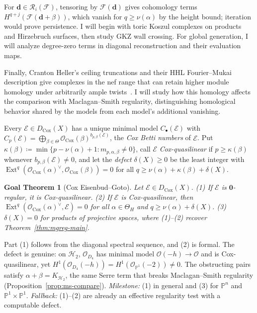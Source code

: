 \documentclass[11pt,reqno]{amsart}
\newtheorem{goalTheorem}[lemma]{Goal Theorem}
\theoremstyle{remark}
\newcommand{\Ext}{\operatorname{Ext}}
\newcommand{\Cox}{\operatorname{Cox}}
\newcommand{\dd}{\mathbf{d}}
\newcommand{\zero}{\mathbf{0}}
\newcommand{\PP}{\mathbb{P}}
\newcommand{\cE}{\mathcal{E}}
\newcommand{\cF}{\mathcal{F}}
\newcommand{\cH}{\mathcal{H}}
\newcommand{\cO}{\mathcal{O}}
\newcommand{\cR}{\mathcal{R}}
\begin{document}
For $\dd\in\cR_i(\cF)$, tensoring by $\cF(\dd)$ gives cohomology terms $H^{q+j}(\cF(\dd+\beta))$, which vanish for $q\geq\nu(\alpha)$ by the height bound; iteration would prove persistence. I will begin with toric Koszul complexes on products and Hirzebruch surfaces, then study GKZ wall crossing. For global generation, I will analyze degree-zero terms in diagonal reconstruction and their evaluation maps.

Finally, Cranton Heller's ceiling truncations and their HHL Fourier--Mukai description give complexes in the nef range that can retain higher module homology under arbitrarily ample twists~\cite{CH25}. I will study how this homology affects the comparison with Maclagan--Smith regularity, distinguishing homological behavior shared by the models from each model's additional vanishing.


 Every $\cE\in D_{\Cox}(X)$ has a unique minimal model $C_\bullet(\cE)$ with $C_p(\cE)=\bigoplus_{\beta\in\Theta}\cO_{\Cox}(\beta)^{b_{p,\beta}(\cE)}$, the \emph{Cox Betti numbers} of $\cE$. Put $\kappa(\beta)\coloneqq\min\{p-\nu(\alpha)+1 : m_{p,\alpha,\beta}\ne0\}$, call $\cE$ \emph{Cox-quasilinear} if $p\ge\kappa(\beta)$ whenever $b_{p,\beta}(\cE)\ne0$, and let the \emph{defect} $\delta(X)\ge0$ be the least integer with $\Ext^q(\cO_{\Cox}(\alpha)^\vee,\cO_{\Cox}(\beta))=0$ for all $q\geq\nu(\alpha)+\kappa(\beta)+\delta(X)$.
\begin{goalTheorem}[Cox Eisenbud--Goto]\label{gt:cox-eg}
Let $\cE\in D_{\Cox}(X)$. (1) If $\cE$ is $\zero$-regular, it is Cox-quasilinear. (2) If $\cE$ is Cox-quasilinear, then $\Ext^q(\cO_{\Cox}(\alpha)^\vee,\cE)=0$ for all $\alpha\in\Theta_H$ and $q\ge\nu(\alpha)+\delta(X)$. (3) $\delta(X)=0$ for products of projective spaces, where (1)--(2) recover Theorem~\ref{thm:mgreg-main}.
\end{goalTheorem}
Part (1) follows from the diagonal spectral sequence, and (2) is formal. The defect is genuine: on $\cH_2$, $\cO_{D_4}$ has minimal model $\cO(-h)\to\cO$ and is Cox-quasilinear, yet $H^1(\cO_{D_4}(-h))=H^1(\cO_{\PP^1}(-2))\ne0$. The obstructing pairs satisfy $\alpha+\beta=K_{\cH_2}$, the same Serre term that breaks Maclagan--Smith regularity (Proposition~\ref{prop:ms-compare}). \emph{Milestone:} (1) in general and (3) for $\PP^n$ and $\PP^1\times\PP^1$. \emph{Fallback:} (1)--(2) are already an effective regularity test with a computable defect.



\end{document}
